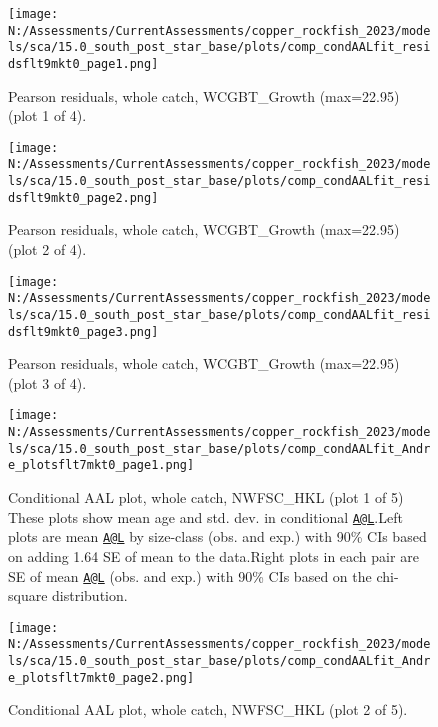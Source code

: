 \documentclass[11pt,
  english,
  letterpaper,
]{article}
\begin{document}
\begin{figure}
\centering
\texttt{[image: N:/Assessments/CurrentAssessments/copper\_rockfish\_2023/models/sca/15.0\_south\_post\_star\_base/plots/comp\_condAALfit\_residsflt9mkt0\_page1.png]}
\caption{Pearson residuals, whole catch, WCGBT\_Growth (max=22.95) (plot 1 of 4).\label{fig:comp_condAALfit_residsflt9mkt0_page1}}
\end{figure}

\begin{figure}
\centering
\texttt{[image: N:/Assessments/CurrentAssessments/copper\_rockfish\_2023/models/sca/15.0\_south\_post\_star\_base/plots/comp\_condAALfit\_residsflt9mkt0\_page2.png]}
\caption{Pearson residuals, whole catch, WCGBT\_Growth (max=22.95) (plot 2 of 4).\label{fig:comp_condAALfit_residsflt9mkt0_page2}}
\end{figure}

\begin{figure}
\centering
\texttt{[image: N:/Assessments/CurrentAssessments/copper\_rockfish\_2023/models/sca/15.0\_south\_post\_star\_base/plots/comp\_condAALfit\_residsflt9mkt0\_page3.png]}
\caption{Pearson residuals, whole catch, WCGBT\_Growth (max=22.95) (plot 3 of 4).\label{fig:comp_condAALfit_residsflt9mkt0_page3}}
\end{figure}

\begin{figure}
\centering
\texttt{[image: N:/Assessments/CurrentAssessments/copper\_rockfish\_2023/models/sca/15.0\_south\_post\_star\_base/plots/comp\_condAALfit\_Andre\_plotsflt7mkt0\_page1.png]}
\caption{Conditional AAL plot, whole catch, NWFSC\_HKL (plot 1 of 5) These plots show mean age and std. dev. in conditional \href{mailto:A@L}{\nolinkurl{A@L}}.Left plots are mean \href{mailto:A@L}{\nolinkurl{A@L}} by size-class (obs. and exp.) with 90\% CIs based on adding 1.64 SE of mean to the data.Right plots in each pair are SE of mean \href{mailto:A@L}{\nolinkurl{A@L}} (obs. and exp.) with 90\% CIs based on the chi-square distribution.\label{fig:comp_condAALfit_Andre_plotsflt7mkt0_page1}}
\end{figure}

\begin{figure}
\centering
\texttt{[image: N:/Assessments/CurrentAssessments/copper\_rockfish\_2023/models/sca/15.0\_south\_post\_star\_base/plots/comp\_condAALfit\_Andre\_plotsflt7mkt0\_page2.png]}
\caption{Conditional AAL plot, whole catch, NWFSC\_HKL (plot 2 of 5).\label{fig:comp_condAALfit_Andre_plotsflt7mkt0_page2}}
\end{figure}
\end{document}
